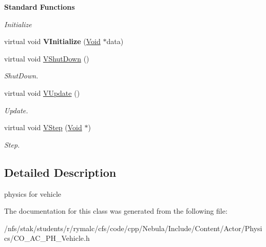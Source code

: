 \begin{Indent}{\bf Standard Functions}\par
{\em \label{_amgrp73a6f6f6732ceea086632f66fc34a9e7}
 Initialize }\begin{DoxyCompactItemize}
\item 
\hypertarget{classContent_1_1Actor_1_1Physics_1_1Vehicle_a49caa78265e0973394d29303be5ad40e}{
virtual void {\bfseries VInitialize} (\hyperlink{structVoid}{Void} $\ast$data)}
\label{classContent_1_1Actor_1_1Physics_1_1Vehicle_a49caa78265e0973394d29303be5ad40e}

\item 
\hypertarget{classContent_1_1Actor_1_1Physics_1_1Vehicle_ab751eba864654f21f15c373e2bde519e}{
virtual void \hyperlink{classContent_1_1Actor_1_1Physics_1_1Vehicle_ab751eba864654f21f15c373e2bde519e}{VShutDown} ()}
\label{classContent_1_1Actor_1_1Physics_1_1Vehicle_ab751eba864654f21f15c373e2bde519e}

\begin{DoxyCompactList}\small\item\em ShutDown. \item\end{DoxyCompactList}\item 
\hypertarget{classContent_1_1Actor_1_1Physics_1_1Vehicle_a0f74c5abb7ba5d38318c947af11af6c0}{
virtual void \hyperlink{classContent_1_1Actor_1_1Physics_1_1Vehicle_a0f74c5abb7ba5d38318c947af11af6c0}{VUpdate} ()}
\label{classContent_1_1Actor_1_1Physics_1_1Vehicle_a0f74c5abb7ba5d38318c947af11af6c0}

\begin{DoxyCompactList}\small\item\em Update. \item\end{DoxyCompactList}\item 
\hypertarget{classContent_1_1Actor_1_1Physics_1_1Vehicle_abb4010b8b4aead4f185939eb305bdcfd}{
virtual void \hyperlink{classContent_1_1Actor_1_1Physics_1_1Vehicle_abb4010b8b4aead4f185939eb305bdcfd}{VStep} (\hyperlink{structVoid}{Void} $\ast$)}
\label{classContent_1_1Actor_1_1Physics_1_1Vehicle_abb4010b8b4aead4f185939eb305bdcfd}

\begin{DoxyCompactList}\small\item\em Step. \item\end{DoxyCompactList}\end{DoxyCompactItemize}
\end{Indent}


\subsection{Detailed Description}
physics for vehicle 

The documentation for this class was generated from the following file:\begin{DoxyCompactItemize}
\item 
/nfs/stak/students/r/rymalc/cfs/code/cpp/Nebula/Include/Content/Actor/Physics/CO\_\-AC\_\-PH\_\-Vehicle.h\end{DoxyCompactItemize}
